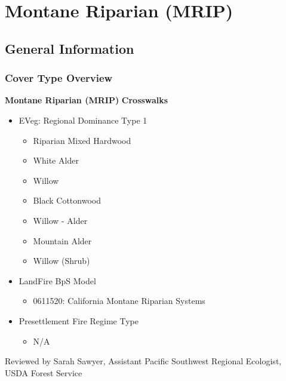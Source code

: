 \newpage
\section{Montane Riparian (MRIP)}
\label{mrip-description}

\subsection*{General Information}

\subsubsection{Cover Type Overview}

\textbf{Montane Riparian (MRIP)}
\newline
\textbf{Crosswalks}
\begin{itemize}
	\item EVeg: Regional Dominance Type 1
	\begin{itemize}
		\item Riparian Mixed Hardwood
		\item White Alder
		\item Willow
		\item Black Cottonwood
		\item Willow - Alder
		\item Mountain Alder
		\item Willow (Shrub)
	\end{itemize}

	\item LandFire BpS Model
	\begin{itemize}
		\item 0611520: California Montane Riparian Systems 
	\end{itemize}

	\item Presettlement Fire Regime Type
	\begin{itemize}
		\item N/A
	\end{itemize}
\end{itemize}

\noindent Reviewed by Sarah Sawyer, Assistant Pacific Southwest Regional Ecologist, USDA Forest Service

